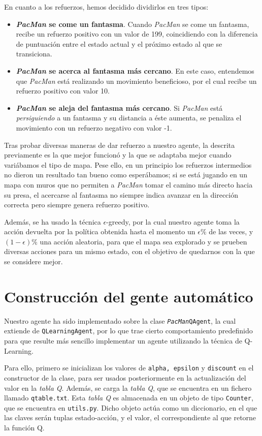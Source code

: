 \documentclass[12pt]{article}
\begin{document}
En cuanto a los refuerzos, hemos decidido dividirlos en tres tipos:
\begin{itemize}
	\item \textbf{\textit{PacMan} se come un fantasma}. Cuando \textit{PacMan} se come un fantasma, recibe un refuerzo positivo con un valor de 199, coincidiendo con la diferencia de puntuación entre el estado actual y el próximo estado al que se transiciona.
	\item \textbf{\textit{PacMan} se acerca al fantasma más cercano}. En este caso, entendemos que \textit{PacMan} está realizando un movimiento beneficioso, por el cual recibe un refuerzo positivo con valor 10.
	\item \textbf{\textit{PacMan} se aleja del fantasma más cercano}. Si \textit{PacMan} está \textit{persiguiendo} a un fantasma y su distancia a éste aumenta, se penaliza el movimiento con un refuerzo negativo con valor -1.
\end{itemize}

Tras probar diversas maneras de dar refuerzo a nuestro agente, la descrita previamente es la que mejor funcionó y la que se adaptaba mejor cuando variábamos el tipo de mapa. Pese ello, en un principio los refuerzos intermedios no dieron un resultado tan bueno como esperábamos; si se está jugando en un mapa con muros que no permiten a \textit{PacMan} tomar el camino más directo hacia su presa, el acercarse al fantasma no siempre indica avanzar en la dirección correcta pero siempre genera refuerzo positivo.

Además, se ha usado la técnica $\epsilon$-greedy, por la cual nuestro agente toma la acción devuelta por la política obtenida hasta el momento un $\epsilon\%$ de las veces, y $(1-\epsilon)\%$ una acción aleatoria, para que el mapa sea explorado y se prueben diversas acciones para un mismo estado, con el objetivo de quedarnos con la que se considere mejor.

\newpage
\section{Construcción del gente automático}

Nuestro agente ha sido implementado sobre la clase \texttt{\textit{PacMan}QAgent}, la cual extiende de \texttt{QLearningAgent}, por lo que trae cierto comportamiento predefinido para que resulte más sencillo implementar un agente utilizando la técnica de Q-Learning.

Para ello, primero se inicializan los valores de \texttt{alpha, epsilon} y \texttt{discount} en el constructor de la clase, para ser usados posteriormente en la actualización del valor en la \textit{tabla Q}. Además, se carga la \textit{tabla Q}, que se encuentra en un fichero llamado \texttt{qtable.txt}. Esta \textit{tabla Q} es almacenada en un objeto de tipo \texttt{Counter}, que se encuentra en \texttt{utils.py}. Dicho objeto actúa como un diccionario, en el que las claves serán tuplas estado-acción, y el valor, el correspondiente al que retorne la función Q.
\end{document}

